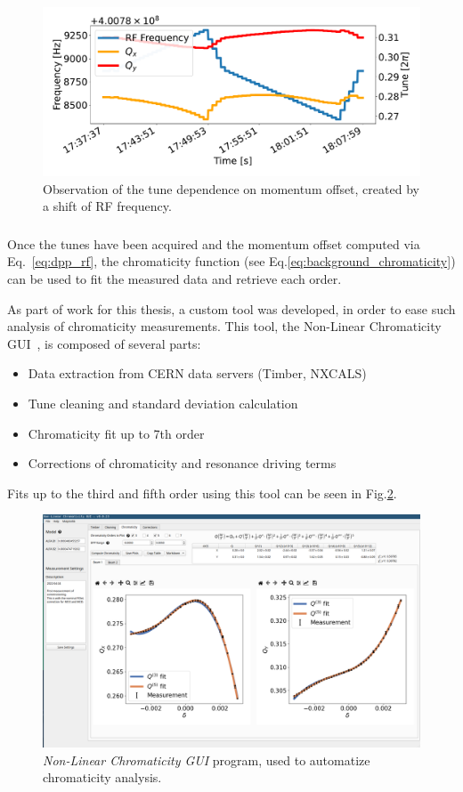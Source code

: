\begin{figure}[H]
    \centering
    \includegraphics[width=1\textwidth]{images/rf_scan.pdf}
    \caption{Observation of the tune dependence on momentum offset, created by a shift of RF
             frequency.}
    \label{fig:measurements:rf_scan}
\end{figure}




\subsubsection{}

Once the tunes have been acquired and the momentum offset computed via Eq.~\eqref{eq:dpp_rf}, the
chromaticity function (see Eq.\eqref{eq:background_chromaticity}) can be used to fit the
measured data and retrieve each order.

As part of work for this thesis, a custom tool was developed, in order to ease such analysis of
chromaticity measurements. This tool, the Non-Linear Chromaticity
GUI~\cite{m_le_garrec_non-linear_2022}, is composed of several parts:

\begin{itemize}
    \tightlist
    \item Data extraction from CERN data servers (Timber, NXCALS)
    \item Tune cleaning and standard deviation calculation
    \item Chromaticity fit up to 7th order
    \item Corrections of chromaticity and resonance driving terms
\end{itemize}


Fits up to the third and fifth order using this tool can be seen in Fig.\ref{fig:chroma_gui}.

\begin{figure}[H]
    \includegraphics[width=\textwidth]{./images/chroma_gui.png}
    \caption{\textit{Non-Linear Chromaticity GUI} program, used to automatize chromaticity 
             analysis.}
    \label{fig:chroma_gui}
\end{figure}